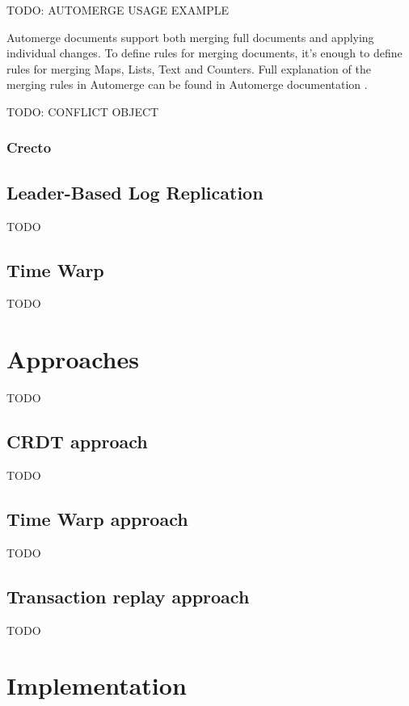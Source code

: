 \documentclass[a4paper, 11pt, oneside]{article}
\theoremstyle{definition}
\begin{document}
TODO: AUTOMERGE USAGE EXAMPLE

Automerge documents support both merging full documents and applying individual changes. To define rules for merging documents, it's enough to define rules for merging Maps, Lists, Text and Counters. Full explanation of the merging rules in Automerge can be found in Automerge documentation \cite{automergerules}.

TODO: CONFLICT OBJECT

\subsubsection{Crecto}
\subsection{Leader-Based Log Replication}
TODO
\subsection{Time Warp}
TODO

\section{Approaches}
TODO
\subsection{CRDT approach}
TODO
\subsection{Time Warp approach}
TODO
\subsection{Transaction replay approach}
TODO

\section{Implementation}

\newpage
\printbibliography
\clearpage
\end{document}

